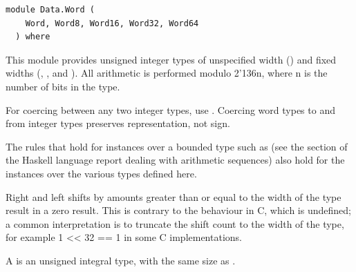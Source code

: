\label{module:Data.Word}
\haddockbeginheader
{\haddockverb\begin{verbatim}
module Data.Word (
    Word, Word8, Word16, Word32, Word64
  ) where\end{verbatim}}
\haddockendheader

This module provides unsigned integer types of unspecified width () and
 fixed widths (, ,  and ). All arithmetic is
 performed modulo 2{\char '136}n, where n is the number of bits in the type.\par
For coercing between any two integer types, use . Coercing word
 types to and from integer types preserves representation, not sign.\par
The rules that hold for  instances over a bounded type such as 
 (see the section of the Haskell language report dealing with arithmetic
 sequences) also hold for the  instances over the various  types
 defined here.\par
Right and left shifts by amounts greater than or equal to the width of the
 type result in a zero result. This is contrary to the behaviour in C, which
 is undefined; a common interpretation is to truncate the shift count to the
 width of the type, for example 1 << 32 == 1 in some C implementations.\par
\begin{haddockdesc}
\item[\begin{tabular}{@{}l}
data Word
\end{tabular}]
{\haddockbegindoc
A  is an unsigned integral type, with the same size as .\par}
\end{haddockdesc}
\begin{haddockdesc}
\item[\begin{tabular}{@{}l}
instance Bits Word\\instance Storable Word\\instance Ix Word\\instance Num Word\\instance Read Word\\instance Integral Word\\instance Real Word\\instance Show Word\\instance Eq Word\\instance Ord Word\\\end{tabular}]
\end{haddockdesc}
